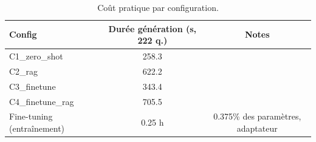 \begin{table}[t]
\centering
\caption{Coût pratique par configuration.}
\label{tab:cost-comparison}
\begin{tabular}{lcc}
\toprule
Config & Durée génération (s, 222 q.) & Notes \\
\midrule
C1_zero_shot & 258.3 & \\
C2_rag & 622.2 & \\
C3_finetune & 343.4 & \\
C4_finetune_rag & 705.5 & \\
Fine-tuning (entraînement) & 0.25 h & 0.375\% des paramètres, adaptateur \\
\bottomrule
\end{tabular}
\end{table}
